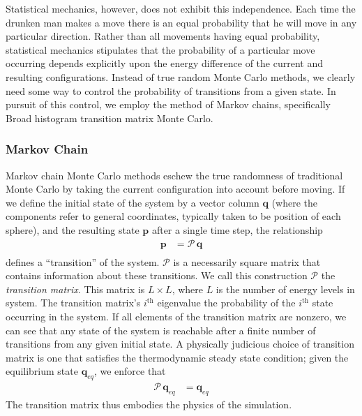 \documentclass[12pt]{article}
\begin{document}
Statistical mechanics, however, does not exhibit this independence. Each time the drunken man makes a move there is an equal probability that he will move in any particular direction. Rather than all movements having equal probability, statistical mechanics stipulates that the probability of a particular move occurring depends explicitly upon the energy difference of the current and resulting configurations. Instead of true random Monte Carlo methods, we clearly need some way to control the probability of transitions from a given state. In pursuit of this control, we employ the method of Markov chains, specifically Broad histogram transition matrix Monte Carlo.
\subsubsection{Markov Chain}

Markov chain Monte Carlo methods eschew the true randomness of traditional Monte Carlo by taking the current configuration into account before moving. If we define the initial state of the system by a vector column $\mathbf{q}$ (where the components refer to general coordinates, typically taken to be position of each sphere), and the resulting state $\mathbf{p}$ after a single time step, the relationship
\begin{align*}
    \mathbf{p} &= \mathcal{P}\, \mathbf{q}\\
\end{align*}
defines a ``transition'' of the system. $\mathcal{P}$ is a necessarily square matrix that contains information about these transitions. We call this construction $\mathcal{P}$ the {\it transition matrix}. This matrix is $L\times L$, where $L$ is the number of energy levels in system. The transition matrix's $i^{\text{th}}$ eigenvalue the probability of the $i^{\text{th}}$ state occurring in the system. If all elements of the transition matrix are nonzero, we can see that any state of the system is reachable after a finite number of transitions from any given initial state. A physically judicious choice of transition matrix is one that satisfies the thermodynamic steady state condition; given the equilibrium state $\mathbf{q}_{eq}$, we enforce that
\begin{align}
    \mathcal{P}\,\mathbf{q}_{eq} &= \mathbf{q}_{eq}
    \label{thermo-steady-state}
\end{align}
The transition matrix thus embodies the physics of the simulation.
\end{document}
